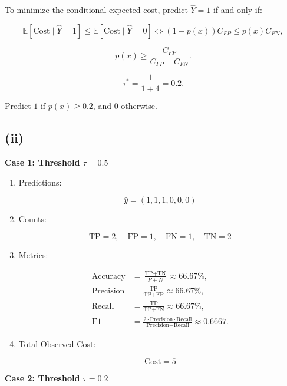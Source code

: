 \documentclass[11pt]{article}
\begin{document}
To minimize the conditional expected cost, predict $\hat{Y}=1$ if and only if:

$$
\mathbb{E}[\text{Cost} \mid \hat{Y}=1] \le \mathbb{E}[\text{Cost} \mid \hat{Y}=0] \iff (1 - p(x)) C_{FP} \le p(x) C_{FN},
$$

$$
p(x) \ge \frac{C_{FP}}{C_{FP} + C_{FN}}.
$$

$$
\tau^* = \frac{1}{1 + 4} = 0.2.
$$

Predict $1$ if $p(x) \ge 0.2$, and $0$ otherwise.

\subsection*{(ii)}

\textbf{Case 1: Threshold $\tau = 0.5$}

\begin{enumerate}
    \item Predictions:
    
    $$
    \hat{y} = (1, 1, 1, 0, 0, 0)
    $$

    \item Counts:
    
    $$
    \text{TP} = 2
    , \quad \text{FP} = 1
    , \quad \text{FN} = 1
    , \quad \text{TN} = 2
    $$

    \item Metrics:
    
    $$
    \begin{aligned}
    \text{Accuracy} &= \frac{\text{TP} + \text{TN}}{P + N} \approx 66.67\%, \\
    \text{Precision} &= \frac{\text{TP}}{\text{TP} + \text{FP}} \approx 66.67\%, \\
    \text{Recall} &= \frac{\text{TP}}{\text{TP} + \text{FN}} \approx 66.67\%, \\
    \text{F1} &= \frac{2 \cdot \text{Precision} \cdot \text{Recall}}{\text{Precision} + \text{Recall}} \approx 0.6667.
    \end{aligned}
    $$

    \item Total Observed Cost:
    
    $$
    \text{Cost} = 5
    $$
\end{enumerate}

\textbf{Case 2: Threshold $\tau = 0.2$}
\end{document}
